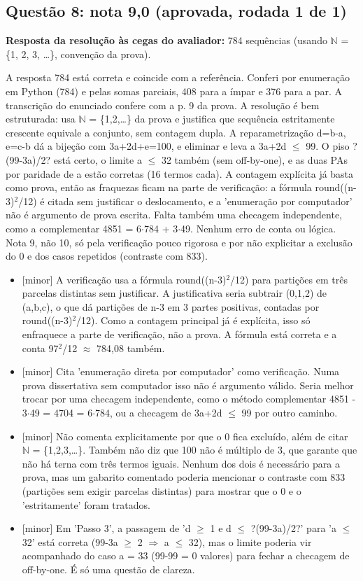 \documentclass{article}%
\begin{document}
\subsection*{Questão 8: nota 9,0 (aprovada, rodada 1 de 1)}%
\textbf{Resposta da resolução às cegas do avaliador:} 784 sequências (usando $\mathbb{N}$ = \{1, 2, 3, \ldots{}\}, convenção da prova).\par %
A resposta 784 está correta e coincide com a referência. Conferi por enumeração em Python (784) e pelas somas parciais, 408 para a ímpar e 376 para a par. A transcrição do enunciado confere com a p. 9 da prova. A resolução é bem estruturada: usa $\mathbb{N}$ = \{1,2,\ldots{}\} da prova e justifica que sequência estritamente crescente equivale a conjunto, sem contagem dupla. A reparametrização d=b-a, e=c-b dá a bijeção com 3a+2d+e=100, e eliminar e leva a 3a+2d $\leq$ 99. O piso ?(99-3a)/2? está certo, o limite a $\leq$ 32 também (sem off{-}by{-}one), e as duas PAs por paridade de a estão corretas (16 termos cada). A contagem explícita já basta como prova, então as fraquezas ficam na parte de verificação: a fórmula round((n-3)$^2$/12) é citada sem justificar o deslocamento, e a 'enumeração por computador' não é argumento de prova escrita. Falta também uma checagem independente, como a complementar 4851 = 6$\cdot$784 + 3$\cdot$49. Nenhum erro de conta ou lógica. Nota 9, não 10, só pela verificação pouco rigorosa e por não explicitar a exclusão do 0 e dos casos repetidos (contraste com 833).%
\begin{itemize}%
\item%
{[}minor{]} A verificação usa a fórmula round((n-3)$^2$/12) para partições em três parcelas distintas sem justificar. A justificativa seria subtrair (0,1,2) de (a,b,c), o que dá partições de n-3 em 3 partes positivas, contadas por round((n-3)$^2$/12). Como a contagem principal já é explícita, isso só enfraquece a parte de verificação, não a prova. A fórmula está correta e a conta 97$^2$/12 $\approx$ 784,08 também.%
\item%
{[}minor{]} Cita 'enumeração direta por computador' como verificação. Numa prova dissertativa sem computador isso não é argumento válido. Seria melhor trocar por uma checagem independente, como o método complementar 4851 - 3$\cdot$49 = 4704 = 6$\cdot$784, ou a checagem de 3a+2d $\leq$ 99 por outro caminho.%
\item%
{[}minor{]} Não comenta explicitamente por que o 0 fica excluído, além de citar $\mathbb{N}$ = \{1,2,3,\ldots{}\}. Também não diz que 100 não é múltiplo de 3, que garante que não há terna com três termos iguais. Nenhum dos dois é necessário para a prova, mas um gabarito comentado poderia mencionar o contraste com 833 (partições sem exigir parcelas distintas) para mostrar que o 0 e o 'estritamente' foram tratados.%
\item%
{[}minor{]} Em 'Passo 3', a passagem de 'd $\geq$ 1 e d $\leq$ ?(99-3a)/2?' para 'a $\leq$ 32' está correta (99-3a $\geq$ 2 $\Rightarrow$ a $\leq$ 32), mas o limite poderia vir acompanhado do caso a = 33 (99-99 = 0 valores) para fechar a checagem de off{-}by{-}one. É só uma questão de clareza.%
\end{itemize}%
\end{document}

